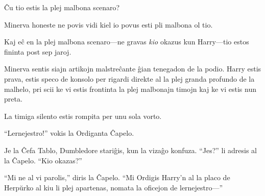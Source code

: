 Ĉu tio estis la plej malbona scenaro?

Minerva honeste ne povis vidi kiel io povus esti pli malbona ol tio.

Kaj eĉ en la plej malbona scenaro—ne gravas \emph{kio} okazus kun
Harry—tio estos fininta post sep jaroj.

Minerva sentis siajn artikojn malstreĉante ĝian tenegadon de la
podio. Harry estis prava, estis speco de konsolo per rigardi direkte
al la plej granda profundo de la malhelo, pri scii ke vi estis frontinta
la plej malbonajn timojn kaj ke vi estis nun preta.

La timiga silento estis rompita per unu sola vorto.

``Lernejestro!'' vokis la Ordiganta Ĉapelo.

Je la Ĉefa Tablo, Dumbledore stariĝis, kun la vizaĝo konfuza. ``Jes?''
li adresis al la Ĉapelo. ``Kio okazas?''

``Mi ne al vi parolis,'' diris la Ĉapelo. ``Mi Ordigis Harry'n al la
placo de Herpŭrko al kiu li plej apartenas, nomata la oficejon de
lernejestro—''
